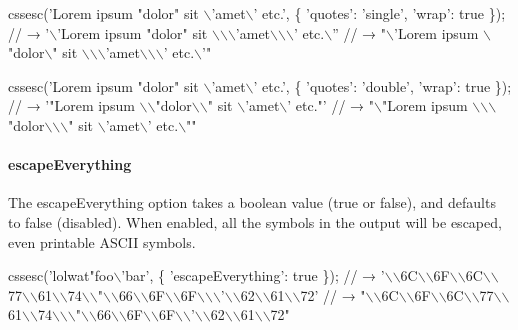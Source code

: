 \begin{DoxyCode}
cssesc('Lorem ipsum "dolor" sit \(\backslash\)'amet\(\backslash\)' etc.', \{
  'quotes': 'single',
  'wrap': true
\});
// → '\(\backslash\)'Lorem ipsum "dolor" sit \(\backslash\)\(\backslash\)\(\backslash\)'amet\(\backslash\)\(\backslash\)\(\backslash\)' etc.\(\backslash\)''
// → "\(\backslash\)'Lorem ipsum \(\backslash\)"dolor\(\backslash\)" sit \(\backslash\)\(\backslash\)\(\backslash\)'amet\(\backslash\)\(\backslash\)\(\backslash\)' etc.\(\backslash\)'"

cssesc('Lorem ipsum "dolor" sit \(\backslash\)'amet\(\backslash\)' etc.', \{
  'quotes': 'double',
  'wrap': true
\});
// → '"Lorem ipsum \(\backslash\)\(\backslash\)"dolor\(\backslash\)\(\backslash\)" sit \(\backslash\)'amet\(\backslash\)' etc."'
// → "\(\backslash\)"Lorem ipsum \(\backslash\)\(\backslash\)\(\backslash\)"dolor\(\backslash\)\(\backslash\)\(\backslash\)" sit \(\backslash\)'amet\(\backslash\)' etc.\(\backslash\)""
\end{DoxyCode}


\paragraph*{{\ttfamily escape\+Everything}}

The {\ttfamily escape\+Everything} option takes a boolean value ({\ttfamily true} or {\ttfamily false}), and defaults to {\ttfamily false} (disabled). When enabled, all the symbols in the output will be escaped, even printable A\+S\+C\+II symbols.


\begin{DoxyCode}
cssesc('lolwat"foo\(\backslash\)'bar', \{
  'escapeEverything': true
\});
// → '\(\backslash\)\(\backslash\)6C\(\backslash\)\(\backslash\)6F\(\backslash\)\(\backslash\)6C\(\backslash\)\(\backslash\)77\(\backslash\)\(\backslash\)61\(\backslash\)\(\backslash\)74\(\backslash\)\(\backslash\)"\(\backslash\)\(\backslash\)66\(\backslash\)\(\backslash\)6F\(\backslash\)\(\backslash\)6F\(\backslash\)\(\backslash\)\(\backslash\)'\(\backslash\)\(\backslash\)62\(\backslash\)\(\backslash\)61\(\backslash\)\(\backslash\)72'
// → "\(\backslash\)\(\backslash\)6C\(\backslash\)\(\backslash\)6F\(\backslash\)\(\backslash\)6C\(\backslash\)\(\backslash\)77\(\backslash\)\(\backslash\)61\(\backslash\)\(\backslash\)74\(\backslash\)\(\backslash\)\(\backslash\)"\(\backslash\)\(\backslash\)66\(\backslash\)\(\backslash\)6F\(\backslash\)\(\backslash\)6F\(\backslash\)\(\backslash\)'\(\backslash\)\(\backslash\)62\(\backslash\)\(\backslash\)61\(\backslash\)\(\backslash\)72"
\end{DoxyCode}


